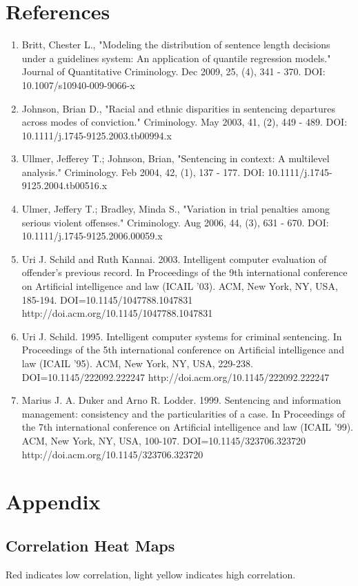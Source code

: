 \documentclass[11pt,letter]{article}
\begin{document}
\section{References}
\begin{enumerate}
\item Britt, Chester L., "Modeling the distribution of sentence length decisions under a guidelines system: An application of quantile regression models." Journal of Quantitative Criminology. Dec 2009, 25, (4), 341 - 370. DOI: 10.1007/s10940-009-9066-x
\item Johnson, Brian D., "Racial and ethnic disparities in sentencing departures across modes of conviction." Criminology. May 2003, 41, (2), 449 - 489. DOI: 10.1111/j.1745-9125.2003.tb00994.x
\item Ullmer, Jefferey T.; Johnson, Brian, "Sentencing in context: A multilevel analysis." Criminology. Feb 2004, 42, (1), 137 - 177. DOI: 10.1111/j.1745-9125.2004.tb00516.x
\item Ulmer, Jeffery T.; Bradley, Minda S., "Variation in trial penalties among serious violent offenses." Criminology. Aug 2006, 44, (3), 631 - 670. DOI: 10.1111/j.1745-9125.2006.00059.x
\item Uri J. Schild and Ruth Kannai. 2003. Intelligent computer evaluation of offender's previous record. In Proceedings of the 9th international conference on Artificial intelligence and law (ICAIL '03). ACM, New York, NY, USA, 185-194. DOI=10.1145/1047788.1047831 http://doi.acm.org/10.1145/1047788.1047831
\item Uri J. Schild. 1995. Intelligent computer systems for criminal sentencing. In Proceedings of the 5th international conference on Artificial intelligence and law (ICAIL '95). ACM, New York, NY, USA, 229-238. DOI=10.1145/222092.222247 http://doi.acm.org/10.1145/222092.222247
\item Marius J. A. Duker and Arno R. Lodder. 1999. Sentencing and information management: consistency and the particularities of a case. In Proceedings of the 7th international conference on Artificial intelligence and law (ICAIL '99). ACM, New York, NY, USA, 100-107. DOI=10.1145/323706.323720 http://doi.acm.org/10.1145/323706.323720
\end{enumerate}
\section{Appendix}

\subsection{Correlation Heat Maps}
Red indicates low correlation, light yellow indicates high correlation.
\end{document}
